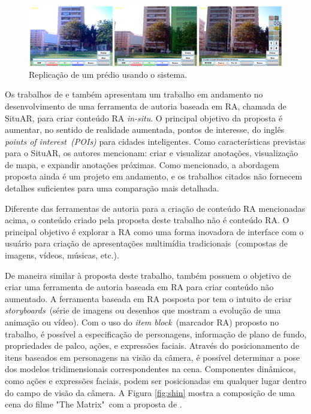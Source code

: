 \documentclass[../main.tex]{subfiles}
\begin{document}
\begin{figure}[!h]
\centering
\includegraphics[width=1\linewidth]{IMG/Relacionados/langlotz.png}
\caption{Replicação de um prédio usando o sistema.}
\label{fig:langlotz}
\end{figure}

Os trabalhos de  e  também apresentam um trabalho em andamento no desenvolvimento de uma ferramenta de autoria baseada em RA, chamada de SituAR, para criar conteúdo RA \emph{in-situ}. O principal objetivo da proposta é aumentar, no sentido de realidade aumentada, pontos de interesse, do inglês \emph{points of interest~(POIs)} para cidades inteligentes. Como características previstas para o SituAR, os autores mencionam: criar e visualizar anotações, visualização de mapa, e expandir anotações próximas. Como mencionado, a abordagem proposta ainda é um projeto em andamento, e os trabalhos citados não fornecem detalhes suficientes para uma comparação mais detalhada.

Diferente das ferramentas de autoria para a criação de conteúdo RA mencionadas acima, o conteúdo criado pela proposta deste trabalho não é conteúdo RA. O principal objetivo é explorar a RA como uma forma inovadora de interface com o usuário para criação de apresentações multimídia tradicionais~(compostas de imagens, vídeos, músicas, etc.).

De maneira similar à proposta deste trabalho,  também possuem o objetivo de criar uma ferramenta de autoria baseada em RA para criar conteúdo não aumentado. A ferramenta baseada em RA posposta por  tem o intuito de criar \emph{storyboards}~(série de imagens ou desenhos que mostram a evolução de uma animação ou vídeo). Com o uso do \emph{item block}~(marcador RA) proposto no trabalho, é possível a especificação de personagens, informação de plano de fundo, propriedades de palco, ações, e expressões faciais. Através do posicionamento de itens baseados em personagens na visão da câmera, é possível determinar a pose dos modelos tridimensionais correspondentes na cena. Componentes dinâmicos, como ações e expressões faciais, podem ser posicionadas em qualquer lugar dentro do campo de visão da câmera. A Figura \ref{fig:shin} mostra a composição de uma cena do filme "The Matrix"~com a proposta de . 
\end{document}
